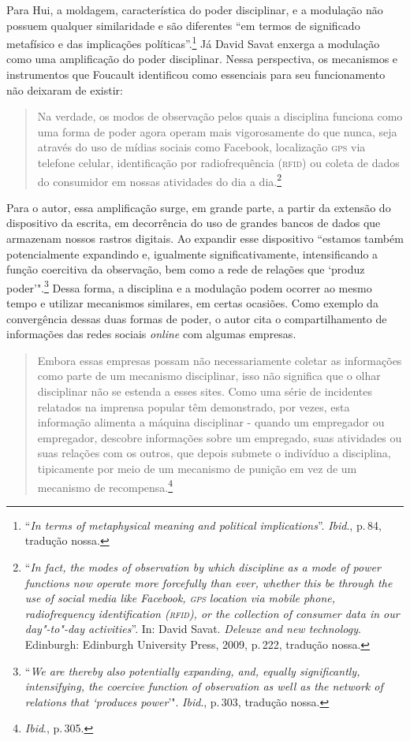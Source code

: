 Para Hui, a moldagem, característica do poder disciplinar, e a modulação não
possuem qualquer similaridade e são diferentes ``em termos de
significado metafísico e das implicações políticas''.\footnote{``\emph{In terms
  of metaphysical meaning and political implications}''. \textit{Ibid}., p.\,84, tradução
nossa.} Já David Savat enxerga a modulação como uma amplificação do poder disciplinar. Nessa perspectiva, os mecanismos e instrumentos que Foucault identificou como
essenciais para seu funcionamento não deixaram de existir:

\begin{quote}
Na verdade, os modos de observação pelos quais a disciplina funciona
como uma forma de poder agora operam mais vigorosamente do que nunca,
seja através do uso de mídias sociais como Facebook, localização \textsc{gps} via
telefone celular, identificação por radiofrequência (\textsc{rfid}) ou coleta de
dados do consumidor em nossas atividades do dia a dia.\footnote{``\emph{In
  fact, the modes of observation by which discipline as a mode of power
  functions now operate more forcefully than ever, whether this be
  through the use of social media like Facebook, \textsc{gps} location via mobile
  phone, radiofrequency identification (\textsc{rfid}), or the collection of
  consumer data in our day"-to"-day activities}''. In: David Savat. \emph{Deleuze and new technology}. Edinburgh: Edinburgh University Press, 2009, p.\,222, tradução nossa.} 
\end{quote}

Para o autor, essa amplificação surge, em grande parte, a partir da
extensão do dispositivo da escrita, em decorrência do uso de grandes
bancos de dados que armazenam nossos rastros digitais. Ao expandir esse
dispositivo ``estamos também potencialmente expandindo e, igualmente
significativamente, intensificando a função coercitiva da observação,
bem como a rede de relações que `produz poder'".\footnote{``\emph{We are
  thereby also potentially expanding, and, equally significantly,
  intensifying, the coercive function of observation as well as the
  network of relations that `produces power}'". \textit{Ibid}., p.\,303, tradução nossa.}
Dessa forma, a disciplina e a modulação podem ocorrer ao mesmo tempo e
utilizar mecanismos similares, em certas ocasiões. Como exemplo da
convergência dessas duas formas de poder, o autor cita o
compartilhamento de informações das redes sociais \emph{online} com algumas
empresas.

\begin{quote}
Embora essas empresas possam não necessariamente coletar as informações
como parte de um mecanismo disciplinar, isso não significa que o olhar
disciplinar não se estenda a esses sites. Como uma série de incidentes
relatados na imprensa popular têm demonstrado, por vezes, esta
informação alimenta a máquina disciplinar - quando um empregador ou
empregador, descobre informações sobre um empregado, suas atividades ou
suas relações com os outros, que depois submete o indivíduo a
disciplina, tipicamente por meio de um mecanismo de punição em vez de um
mecanismo de recompensa.\footnote{\textit{Ibid}., p.\,305.}
\end{quote}

